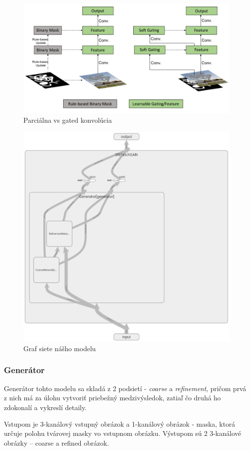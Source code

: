 \documentclass [11pt, a4paper]{article}
\begin{document}
	\begin{figure}[h]
		\centering
		\includegraphics[width=0.7\linewidth]{img/gated-conv}
		\caption{Parciálna vs gated konvolúcia}
		\label{fig:gated-conv}
	\end{figure}
	
	
	\begin{figure}[h]
		\centering
		\includegraphics[width=0.8\linewidth]{img/net-arch}
		\caption{Graf siete nášho modelu}
		\label{fig:net-arch}
	\end{figure}
	
	\subsubsection{Generátor}
	Generátor tohto modelu sa skladá z 2 podsietí - \textit{coarse} a \textit{refinement}, pričom prvá z nich má za úlohu vytvoriť priebežný medzivýsledok, zatiaľ čo druhá ho zdokonalí a vykreslí detaily.
	
	Vstupom je 3-kanálový vstupný obrázok a 1-kanálový obrázok - maska, ktorá určuje polohu tvárovej masky vo vstupnom obrázku. Výstupom sú 2 3-kanálové obrázky -- coarse a refined obrázok.
	
\end{document}
